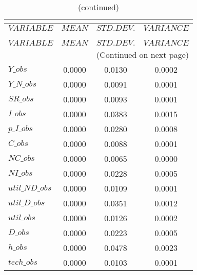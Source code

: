  
\begin{center}
\begin{longtable}{lccc} 
\caption{THEORETICAL MOMENTS}\\
 \label{Table:th_moments}\\
\toprule 
$VARIABLE       $	 & 	 $         MEAN$	 & 	 $    STD. DEV.$	 & 	 $     VARIANCE$\\
\midrule \endfirsthead 
\caption{(continued)}\\
 \toprule \\ 
$VARIABLE       $	 & 	 $         MEAN$	 & 	 $    STD. DEV.$	 & 	 $     VARIANCE$\\
\midrule \endhead 
\midrule \multicolumn{4}{r}{(Continued on next page)} \\ \bottomrule \endfoot 
\bottomrule \endlastfoot 
$Y\_obs         $	 & 	       0.0000	 & 	       0.0130	 & 	       0.0002 \\ 
$Y\_N\_obs      $	 & 	       0.0000	 & 	       0.0091	 & 	       0.0001 \\ 
$SR\_obs        $	 & 	       0.0000	 & 	       0.0093	 & 	       0.0001 \\ 
$I\_obs         $	 & 	       0.0000	 & 	       0.0383	 & 	       0.0015 \\ 
$p\_I\_obs      $	 & 	       0.0000	 & 	       0.0280	 & 	       0.0008 \\ 
$C\_obs         $	 & 	       0.0000	 & 	       0.0088	 & 	       0.0001 \\ 
$NC\_obs        $	 & 	       0.0000	 & 	       0.0065	 & 	       0.0000 \\ 
$NI\_obs        $	 & 	       0.0000	 & 	       0.0228	 & 	       0.0005 \\ 
$util\_ND\_obs  $	 & 	       0.0000	 & 	       0.0109	 & 	       0.0001 \\ 
$util\_D\_obs   $	 & 	       0.0000	 & 	       0.0351	 & 	       0.0012 \\ 
$util\_obs      $	 & 	       0.0000	 & 	       0.0126	 & 	       0.0002 \\ 
$D\_obs         $	 & 	       0.0000	 & 	       0.0223	 & 	       0.0005 \\ 
$h\_obs         $	 & 	       0.0000	 & 	       0.0478	 & 	       0.0023 \\ 
$tech\_obs      $	 & 	       0.0000	 & 	       0.0103	 & 	       0.0001 \\ 
\end{longtable}
 \end{center}
